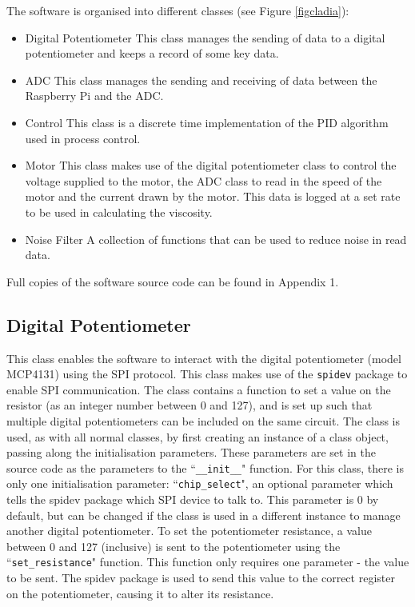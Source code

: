 \documentclass[twoside,a4]{report}
\def\br{\newline \newline \noindent}
\begin{document}
	\noindent
	The software is organised into different classes (see Figure \ref{figcladia}):
	\begin{itemize}
		\item Digital Potentiometer \newline 
		This class manages the sending of data to a digital potentiometer and keeps a record of some key data.
		\item ADC \newline 
		This class manages the sending and receiving of data between the Raspberry Pi and the ADC.
		\item Control\newline 
		This class is a discrete time implementation of the PID algorithm used in process control.
		\item Motor \newline
		This class makes use of the digital potentiometer class to control the voltage supplied to the motor, the ADC class to read in the speed of the motor and the current drawn by the motor. This data is logged at a set rate to be used in calculating the viscosity.
		\item Noise Filter \newline
		A collection of functions that can be used to reduce noise in read data.
	\end{itemize}
	Full copies of the software source code can be found in Appendix 1.
	
	\subsection*{Digital Potentiometer} %
	This class enables the software to interact with the digital potentiometer (model MCP4131) using the SPI protocol. This class makes use of the \texttt{spidev} package to enable SPI communication. The class contains a function to set a value on the resistor (as an integer number between 0 and 127), and is set up such that multiple digital potentiometers can be included on the same circuit.
	\br
	The class is used, as with all normal classes, by first creating an instance of a class object, passing along the initialisation parameters. These parameters are set in the source code as the parameters to the ``\texttt{\_\_init\_\_}" function. For this class, there is only one initialisation parameter: ``\texttt{chip\_select}", an optional parameter which tells the spidev package which SPI device to talk to. This parameter is 0 by default, but can be changed if the class is used in a different instance to manage another digital potentiometer.
	\br
	To set the potentiometer resistance, a value between 0 and 127 (inclusive) is sent to the potentiometer using the ``\texttt{set\_resistance}" function. This function only requires one parameter - the value to be sent. The spidev package is used to send this value to the correct register on the potentiometer, causing it to alter its resistance.
	
\end{document}
